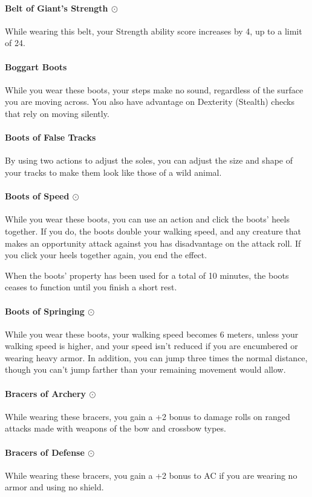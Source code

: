     \paragraph{Belt of Giant's Strength $\odot$}
        While wearing this belt, your Strength ability score increases by 4, up to a limit of 24.
    \paragraph{Boggart Boots}
        While you wear these boots, your steps make no sound, regardless of the surface you are moving across. You also have advantage on Dexterity (Stealth) checks that rely on moving silently.
    \paragraph{Boots of False Tracks}
        By using two actions to adjust the soles, you can adjust the size and shape of your tracks to make them look like those of a wild animal.
    \paragraph{Boots of Speed $\odot$}
        While you wear these boots, you can use an action and click the boots' heels together.
        If you do, the boots double your walking speed, and any creature that makes an opportunity attack against you has disadvantage on the attack roll.
        If you click your heels together again, you end the effect.

        When the boots' property has been used for a total of 10 minutes, the boots ceases to function until you finish a short rest.
    \paragraph{Boots of Springing $\odot$}
        While you wear these boots, your walking speed becomes 6 meters, unless your walking speed is higher, and your speed isn't reduced if you are encumbered or wearing heavy armor.
        In addition, you can jump three times the normal distance, though you can't jump farther than your remaining movement would allow.
    \paragraph{Bracers of Archery $\odot$}
        While wearing these bracers, you gain a +2 bonus to damage rolls on ranged attacks made with weapons of the bow and crossbow types.
    \paragraph{Bracers of Defense $\odot$}
        While wearing these bracers, you gain a +2 bonus to AC if you are wearing no armor and using no shield.
